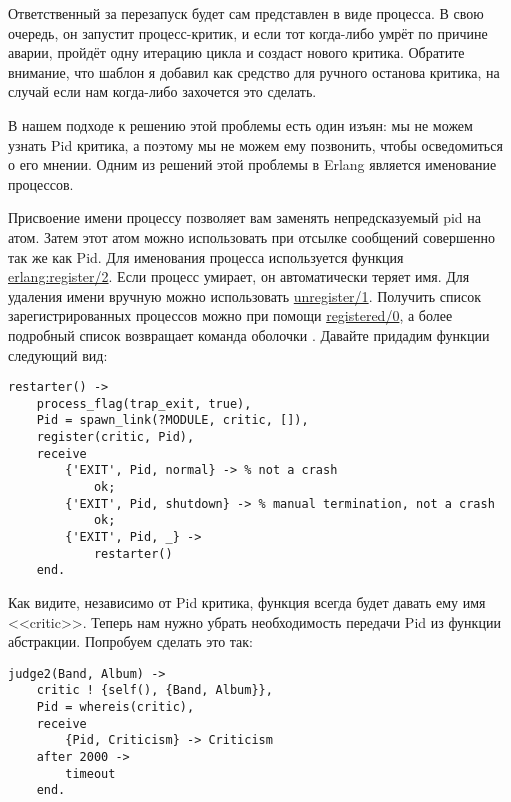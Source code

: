 Ответственный за перезапуск будет сам представлен в виде процесса.
В свою очередь, он запустит процесс\--критик, и если тот когда\--либо умрёт по причине аварии,  пройдёт одну итерацию цикла и создаст нового критика.
Обратите внимание, что шаблон  я добавил как средство для ручного останова критика, на случай если нам когда\--либо захочется это сделать.

В нашем подходе к решению этой проблемы есть один изъян: мы не можем узнать Pid критика, а поэтому мы не можем ему позвонить, чтобы осведомиться о его мнении.
Одним из решений этой проблемы в Erlang является именование процессов.

Присвоение имени процессу позволяет вам заменять непредсказуемый pid на атом.
Затем этот атом можно использовать при отсылке сообщений совершенно так же как Pid.
Для именования процесса используется функция \href{http://erldocs.com/R15B/erts/erlang.html\#register/2}{erlang:register/2}.
Если процесс умирает, он автоматически теряет имя.
Для удаления имени вручную можно использовать \href{http://erldocs.com/R15B/erts/erlang.html\#unregister/1}{unregister/1}.
Получить список зарегистрированных процессов можно при помощи \href{http://erldocs.com/R15B/erts/erlang.html\#registered/0}{registered/0}, а более подробный список возвращает команда оболочки .
Давайте придадим функции  следующий вид:
\begin{lstlisting}[style=erlang]
restarter() ->
    process_flag(trap_exit, true),
    Pid = spawn_link(?MODULE, critic, []),
    register(critic, Pid),
    receive
        {'EXIT', Pid, normal} -> % not a crash
            ok;
        {'EXIT', Pid, shutdown} -> % manual termination, not a crash
            ok;
        {'EXIT', Pid, _} ->
            restarter()
    end.
\end{lstlisting}

Как видите, независимо от Pid критика, функция  всегда будет давать ему имя <<critic>>.
Теперь нам нужно убрать необходимость передачи Pid из функции абстракции.
Попробуем сделать это так:
\begin{lstlisting}[style=erlang]
judge2(Band, Album) ->
    critic ! {self(), {Band, Album}},
    Pid = whereis(critic),
    receive
        {Pid, Criticism} -> Criticism
    after 2000 ->
        timeout
    end.
\end{lstlisting}

